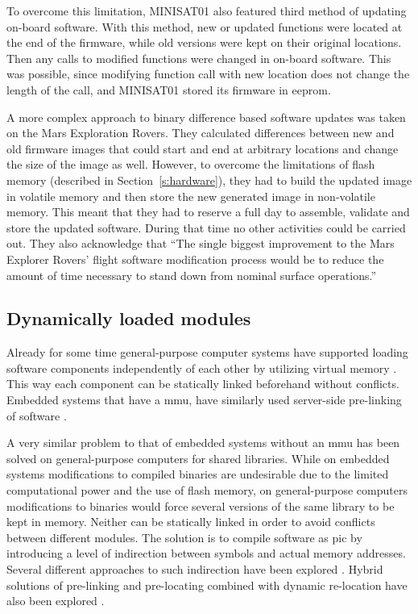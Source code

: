 To overcome this limitation, MINISAT01 also featured third method of updating on-board software. With this method, new or updated functions were located at the end of the firmware, while old versions were kept on their original locations. Then any calls to modified functions were changed in on-board software. This was possible, since modifying function call with new location does not change the length of the call, and MINISAT01 stored its firmware in \gls{eeprom}. \cite{Garrido1998}

A more complex approach to binary difference based software updates was taken on the Mars Exploration Rovers. They calculated differences between new and old firmware images that could start and end at arbitrary locations and change the size of the image as well. However, to overcome the limitations of flash memory (described in Section~\ref{s:hardware}), they had to build the updated image in volatile memory and then store the new generated image in non-volatile memory. This meant that they had to reserve a full day to assemble, validate and store the updated software. During that time no other activities could be carried out. They also acknowledge that ``The single biggest improvement to the Mars Explorer Rovers' flight software modification process would be to reduce the amount of time necessary to stand down from nominal surface operations.'' \cite{Greco2005}

\subsection{Dynamically loaded modules}

Already for some time general-purpose computer systems have supported loading software components independently of each other by utilizing virtual memory \cite{Kilburn1962}. This way each component can be statically linked beforehand without conflicts. Embedded systems that have a \gls{mmu}, have similarly used server-side pre-linking of software \cite{Shen2010}.

A very similar problem to that of embedded systems without an \gls{mmu} has been solved on general-purpose computers for shared libraries. While on embedded systems modifications to compiled binaries are undesirable due to the limited computational power and the use of flash memory, on general-purpose computers modifications to binaries would force several versions of the same library to be kept in memory. Neither can be statically linked in order to avoid conflicts between different modules. The solution is to compile software as \gls{pic} by introducing a level of indirection between symbols and actual memory addresses. Several different approaches to such indirection have been explored \cite[Chapter~8]{Levine1999}. Hybrid solutions of pre-linking and pre-locating combined with dynamic re-location have also been explored \cite{Dong2009}.

